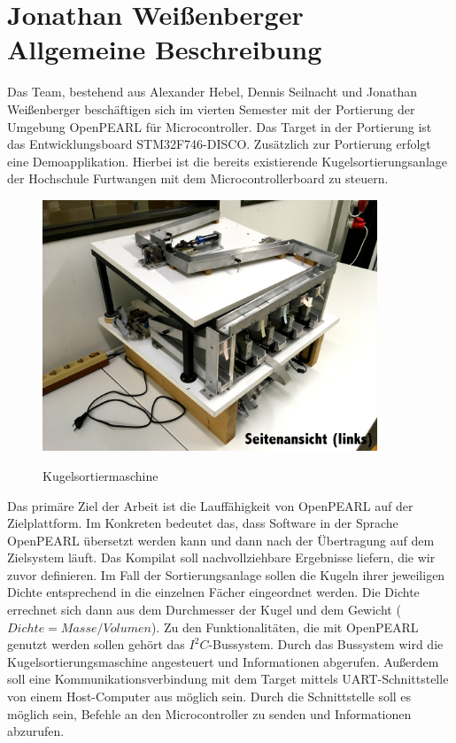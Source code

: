 \chapter[(Jonathan Weißenberger) Allgemeine Beschreibung]{Jonathan Weißenberger\\Allgemeine Beschreibung}
Das Team, bestehend aus Alexander Hebel, Dennis Seilnacht und Jonathan Weißenberger beschäftigen sich im vierten Semester mit der Portierung der Umgebung OpenPEARL für Microcontroller. Das Target in der Portierung ist das Entwicklungsboard STM32F746-DISCO. Zusätzlich zur Portierung erfolgt eine Demoapplikation. Hierbei ist die bereits existierende Kugelsortierungsanlage der Hochschule Furtwangen mit dem Microcontrollerboard zu steuern.
\begin{figure}[h]
\begin{center}
\includegraphics[width=10cm]{grafiken/Seitenansicht.jpg}
\label{bild_kugelsortiermaschine}
\caption{Kugelsortiermaschine}
\end{center}
\end{figure}
Das primäre Ziel der Arbeit ist die Lauffähigkeit von OpenPEARL auf der Zielplattform. Im Konkreten bedeutet das, dass Software in der Sprache OpenPEARL übersetzt werden kann und dann nach der Übertragung auf dem Zielsystem läuft. Das Kompilat soll nachvollziehbare Ergebnisse liefern, die wir zuvor definieren. Im Fall der Sortierungsanlage sollen die Kugeln ihrer jeweiligen Dichte entsprechend in die einzelnen Fächer eingeordnet werden. Die Dichte errechnet sich dann aus dem Durchmesser der Kugel und dem Gewicht ($Dichte=Masse/Volumen$). Zu den Funktionalitäten, die mit OpenPEARL genutzt werden sollen gehört das $I^2C$-Bussystem. Durch das Bussystem wird die Kugelsortierungsmaschine angesteuert und Informationen abgerufen. Außerdem soll eine Kommunikationsverbindung mit dem Target mittels UART-Schnittstelle von einem Host-Computer aus möglich sein. Durch die Schnittstelle soll es möglich sein, Befehle an den Microcontroller zu senden und Informationen abzurufen. 

